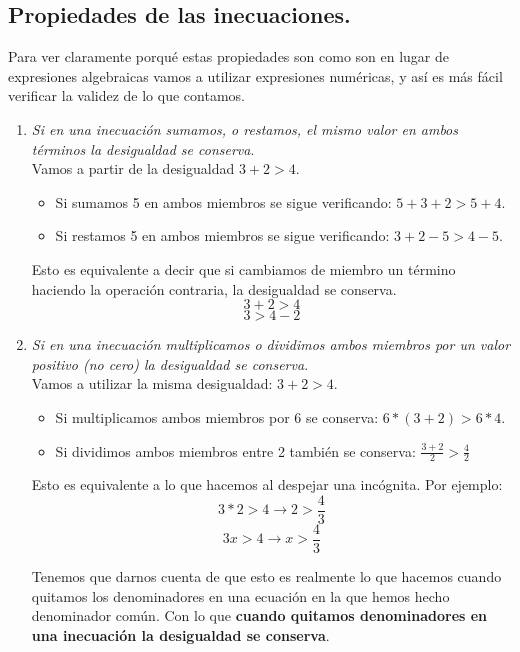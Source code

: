 \documentclass[a4paper,11pt,answers]{exam}
\begin{document}
  \subsection{Propiedades de las inecuaciones.}\label{propiedades_inecuaciones}
  Para ver claramente porqué estas propiedades son como son en lugar de expresiones algebraicas
  vamos a utilizar expresiones numéricas, y así es más fácil verificar la validez de lo que
  contamos.
  \begin{enumerate}
  \item \emph{Si en una inecuación sumamos, o restamos, el mismo valor en ambos términos
      la desigualdad se conserva}.\\
    Vamos a partir de la desigualdad $ 3 +2 > 4$.
    \begin{itemize}
    \item Si sumamos 5 en ambos miembros se sigue verificando: $5 + 3 + 2 > 5 + 4$.
    \item Si restamos 5 en ambos miembros se sigue verificando: $3 + 2 - 5 > 4 - 5$.
    \end{itemize}
    Esto es equivalente a decir que si cambiamos de miembro un término haciendo la operación
    contraria, la desigualdad se conserva.
    \[3 + 2 > 4\]
    \[3 > 4 -2 \]
  \item \emph{Si en una inecuación multiplicamos o dividimos ambos miembros por un valor
    positivo (no cero) la desigualdad se conserva}.\\
    Vamos a utilizar la misma desigualdad: $3+2 > 4$.
    \begin{itemize}
    \item Si multiplicamos ambos miembros por 6 se conserva: $6*(3+2) > 6*4$.
    \item Si dividimos ambos miembros entre 2 también se conserva: $\frac{3+2}{2} > \frac{4}{2}$
    \end{itemize}
    Esto es equivalente a lo que hacemos al despejar una incógnita. Por ejemplo:
    \[3*2 > 4 \longrightarrow 2>\frac{4}{3}\]
    \[3x > 4 \longrightarrow x > \frac{4}{3}\]
    
    Tenemos que darnos cuenta de que esto es realmente lo que hacemos cuando quitamos los denominadores en una
    ecuación en la que hemos hecho denominador común. Con lo que \textbf{cuando quitamos denominadores en una
      inecuación la desigualdad se conserva}.
    

\end{enumerate}
\end{document}
